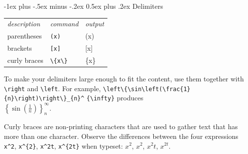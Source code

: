 \documentclass[a4paper,10pt]{article}
\makeatletter
\renewcommand{\section}{\@startsection{section}{1}{0mm}%
                                {-1ex plus -.5ex minus -.2ex}%
                                {0.5ex plus .2ex}%
                                {\normalfont\large\bfseries}}
\makeatother
\begin{document}
\begin{multicols}{3}
    \section{Delimiters}

    \begin{tabular}{lll}
        \emph{description} & \emph{command} & \emph{output} \\
        parentheses        & \verb!(x)!     & (x)           \\
        brackets           & \verb![x]!     & [x]           \\
        curly braces       & \verb!\{x\}!   & \{x\}         \\
    \end{tabular}

    To make your delimiters large enough to fit the content, use them together with \verb!\right! and \verb!\left!. For example, \verb!\left\{\sin\left(\frac{1}{n}\right)\right\}_{n}^! \verb!{\infty}! produces\\ $\displaystyle \left\{\sin\left(\frac{1}{n}\right)\right\}_{n}^{\infty}$.

    Curly braces are non-printing characters that are used to gather text that has more than one character. Observe the differences between the four expressions \verb!x^2!, \verb!x^{2}!, \verb!x^2t!, \verb!x^{2t}! when typeset: $x^2$, $x^{2}$, $x^2t$, $x^{2t}$.



\end{multicols}
\end{document}
